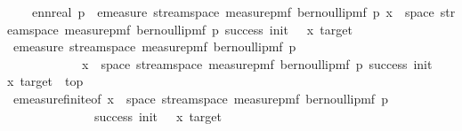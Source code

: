 \begin{isabellebody}
\ \ \ \ ennreal\ p\ {\isacharasterisk}{\kern0pt}\ emeasure\ {\isacharparenleft}{\kern0pt}stream{\isacharunderscore}{\kern0pt}space\ {\isacharparenleft}{\kern0pt}measure{\isacharunderscore}{\kern0pt}pmf\ {\isacharparenleft}{\kern0pt}bernoulli{\isacharunderscore}{\kern0pt}pmf\ p{\isacharparenright}{\kern0pt}{\isacharparenright}{\kern0pt}{\isacharparenright}{\kern0pt}\ {\isacharbraceleft}{\kern0pt}x\ {\isasymin}\ space\ {\isacharparenleft}{\kern0pt}stream{\isacharunderscore}{\kern0pt}space\ {\isacharparenleft}{\kern0pt}measure{\isacharunderscore}{\kern0pt}pmf\ {\isacharparenleft}{\kern0pt}bernoulli{\isacharunderscore}{\kern0pt}pmf\ p{\isacharparenright}{\kern0pt}{\isacharparenright}{\kern0pt}{\isacharparenright}{\kern0pt}{\isachardot}{\kern0pt}\ success\ {\isacharparenleft}{\kern0pt}init\ {\isacharplus}{\kern0pt}\ {}{\isacharparenright}{\kern0pt}\ x\ target{\isacharbraceright}{\kern0pt}{\isachardoublequoteclose}\isanewline
\ \ \ \ \isamarkupfalse%
{\isacharminus}{\kern0pt}\isanewline
\ \ \ \ \ \ \isamarkupfalse%
\ {\isachardoublequoteopen}emeasure\ {\isacharparenleft}{\kern0pt}stream{\isacharunderscore}{\kern0pt}space\ {\isacharparenleft}{\kern0pt}measure{\isacharunderscore}{\kern0pt}pmf\ {\isacharparenleft}{\kern0pt}bernoulli{\isacharunderscore}{\kern0pt}pmf\ p{\isacharparenright}{\kern0pt}{\isacharparenright}{\kern0pt}{\isacharparenright}{\kern0pt}\isanewline
\ \ \ \ \ \ \ \ \ \ \ \ {\isacharbraceleft}{\kern0pt}x\ {\isasymin}\ space\ {\isacharparenleft}{\kern0pt}stream{\isacharunderscore}{\kern0pt}space\ {\isacharparenleft}{\kern0pt}measure{\isacharunderscore}{\kern0pt}pmf\ {\isacharparenleft}{\kern0pt}bernoulli{\isacharunderscore}{\kern0pt}pmf\ p{\isacharparenright}{\kern0pt}{\isacharparenright}{\kern0pt}{\isacharparenright}{\kern0pt}{\isachardot}{\kern0pt}\ success\ {\isacharparenleft}{\kern0pt}init\ {\isacharplus}{\kern0pt}\ {}{\isacharparenright}{\kern0pt}\ x\ target{\isacharbraceright}{\kern0pt}\ {\isasymnoteq}\ top{\isachardoublequoteclose}\isanewline
\ \ \ \ \ \ \ \ \isamarkupfalse%
\ emeasure{\isacharunderscore}{\kern0pt}finite{\isacharbrackleft}{\kern0pt}of\ {\isachardoublequoteopen}{\isacharbraceleft}{\kern0pt}x\ {\isasymin}\ space\ {\isacharparenleft}{\kern0pt}stream{\isacharunderscore}{\kern0pt}space\ {\isacharparenleft}{\kern0pt}measure{\isacharunderscore}{\kern0pt}pmf\ {\isacharparenleft}{\kern0pt}bernoulli{\isacharunderscore}{\kern0pt}pmf\ p{\isacharparenright}{\kern0pt}{\isacharparenright}{\kern0pt}{\isacharparenright}{\kern0pt}{\isachardot}{\kern0pt}\isanewline
\ \ \ \ \ \ \ \ \ \ \ \ \ \ success\ {\isacharparenleft}{\kern0pt}init\ {\isacharplus}{\kern0pt}\ {}{\isacharparenright}{\kern0pt}\ x\ target{\isacharbraceright}{\kern0pt}{\isachardoublequoteclose}{\isacharbrackright}{\kern0pt}\isanewline

\end{isabellebody}
